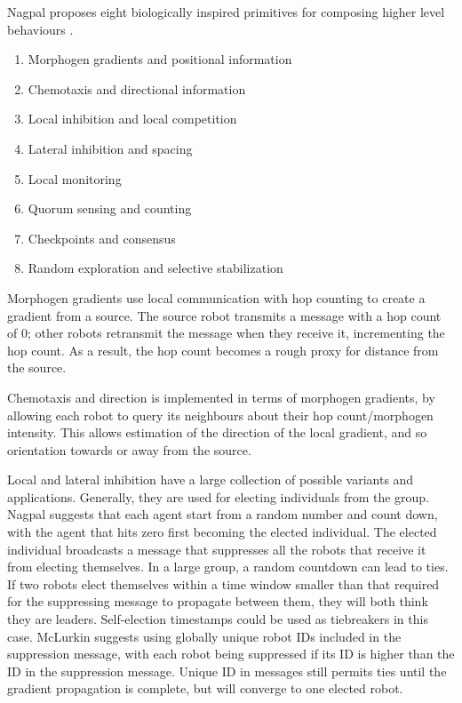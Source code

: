 \documentclass[]{article}
\begin{document}
Nagpal proposes eight biologically inspired primitives for composing higher level behaviours \cite{nagpal2004catalog}.
 
\begin{enumerate}[noitemsep]
\item Morphogen gradients and positional information
\item Chemotaxis and directional information
\item Local inhibition and local competition
\item Lateral inhibition and spacing
\item Local monitoring
\item Quorum sensing and counting
\item Checkpoints and consensus
\item Random exploration and selective stabilization
\end{enumerate}

Morphogen gradients use local communication with hop counting to create a gradient from a source. 
The source robot transmits a message with a hop count of 0; other robots retransmit the message when they receive it, incrementing the hop count. 
As a result, the hop count becomes a rough proxy for distance from the source. 

Chemotaxis and direction is implemented in terms of morphogen gradients, by allowing each robot to query its neighbours about their hop count/morphogen intensity. 
This allows estimation of the direction of the local gradient, and so orientation towards or away from the source. 

Local and lateral inhibition have a large collection of possible variants and applications. 
Generally, they are used for electing individuals from the group. 
Nagpal suggests that each agent start from a random number and count down, with the agent that hits zero first becoming the elected individual. 
The elected individual broadcasts a message that suppresses all the robots that receive it from electing themselves. 
In a large group, a random countdown can lead to ties.
If two robots elect themselves within a time window smaller than that required for the suppressing message to propagate between them, they will both think they are leaders.
Self-election timestamps could be used as tiebreakers in this case. 
McLurkin suggests using globally unique robot IDs included in the suppression message, with each robot being suppressed if its ID is higher than the ID in the suppression message.
Unique ID in messages still permits ties until the gradient propagation is complete, but will converge to one elected robot.
 
\end{document}
